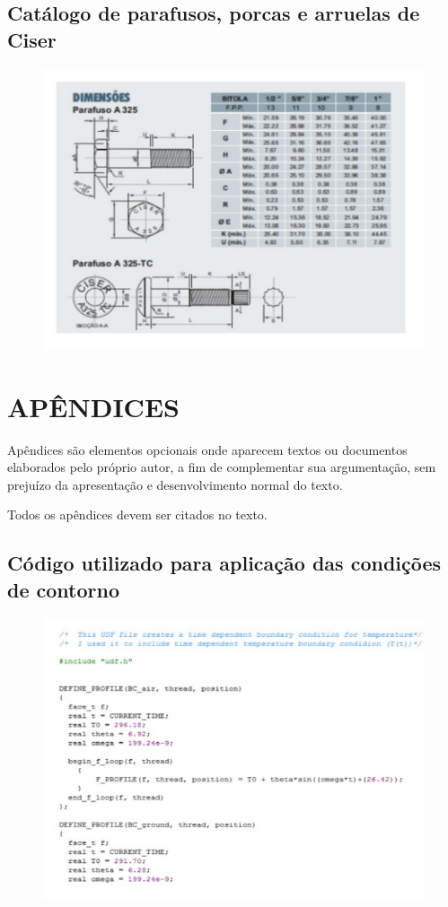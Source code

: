 \documentclass[a4paper,12pt,oneside]{article}
\numberwithin{equation}{section}
\begin{document}
\subsection{Catálogo de parafusos, porcas e arruelas de Ciser}
\begin{figure}[h]
\centering
\includegraphics[width=1\linewidth]{img/catalogo}
\end{figure}

\section{APÊNDICES}

Apêndices são elementos opcionais onde aparecem textos ou documentos elaborados pelo próprio autor, a fim de complementar sua argumentação, sem prejuízo da apresentação e
desenvolvimento normal do texto.


Todos os apêndices devem ser citados no texto.


\subsection{Código utilizado para aplicação das condições de contorno}

\begin{figure}[h]
\centering
\includegraphics[width=1\linewidth]{img/codigo}
\end{figure}
\end{document}
